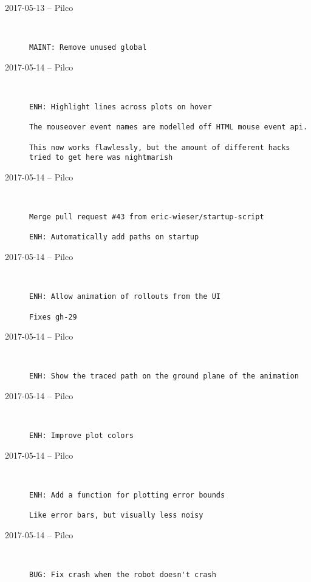 \begin{description}
  \item[2017-05-13 -- Pilco] \hfill \
\begin{lstlisting}
MAINT: Remove unused global
\end{lstlisting}


  \item[2017-05-14 -- Pilco] \hfill \
\begin{lstlisting}
ENH: Highlight lines across plots on hover

The mouseover event names are modelled off HTML mouse event api.

This now works flawlessly, but the amount of different hacks tried to get here was nightmarish
\end{lstlisting}


  \item[2017-05-14 -- Pilco] \hfill \
\begin{lstlisting}
Merge pull request #43 from eric-wieser/startup-script

ENH: Automatically add paths on startup\end{lstlisting}


  \item[2017-05-14 -- Pilco] \hfill \
\begin{lstlisting}
ENH: Allow animation of rollouts from the UI

Fixes gh-29
\end{lstlisting}


  \item[2017-05-14 -- Pilco] \hfill \
\begin{lstlisting}
ENH: Show the traced path on the ground plane of the animation
\end{lstlisting}


  \item[2017-05-14 -- Pilco] \hfill \
\begin{lstlisting}
ENH: Improve plot colors
\end{lstlisting}


  \item[2017-05-14 -- Pilco] \hfill \
\begin{lstlisting}
ENH: Add a function for plotting error bounds

Like error bars, but visually less noisy
\end{lstlisting}


  \item[2017-05-14 -- Pilco] \hfill \
\begin{lstlisting}
BUG: Fix crash when the robot doesn't crash


\end{lstlisting}
\end{description}
